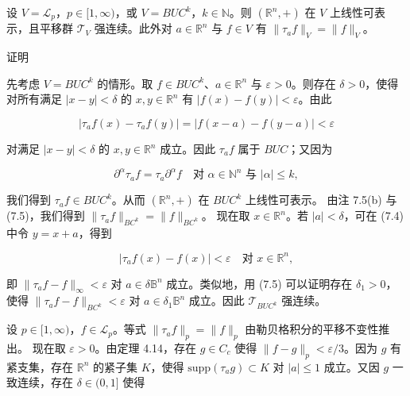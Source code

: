 \begin{theorem}

设 $ V = \mathcal{L}_{p} $，$ p \in [1,\infty) $，或 $ V = BUC^{k} $，$ k \in \mathbb{N} $。则 $ (\mathbb{R}^{n},+) $ 在 $ V $ 上线性可表示，且平移群 $ \mathcal{T}_{V} $ 强连续。此外对 $ a \in \mathbb{R}^{n} $ 与 $ f \in V $ 有 $ \|\tau_{a}f\|_{V} = \|f\|_{V} $。

证明

\begin{subitems}
\item

先考虑 $ V = BUC^{k} $ 的情形。取 $ f \in BUC^{k} $、$ a \in \mathbb{R}^{n} $ 与 $ \varepsilon > 0 $。则存在 $ \delta > 0 $，使得对所有满足 $ |x-y| < \delta $ 的 $ x, y \in \mathbb{R}^{n} $ 有 $ |f(x) - f(y)| < \varepsilon $。由此

\begin{equation}
|\tau_{a}f(x) - \tau_{a}f(y)| = |f(x-a) - f(y-a)| < \varepsilon\tag{7.4}
\end{equation}

对满足 $ |x-y| < \delta $ 的 $ x, y \in \mathbb{R}^{n} $ 成立。因此 $ \tau_{a}f $ 属于 $ BUC $；又因为

\begin{equation}
\partial^{\alpha}\tau_{a}f = \tau_{a}\partial^{\alpha}f \quad \text{对 } \alpha \in \mathbb{N}^{n} \text{ 与 } |\alpha| \le k ,\tag{7.5}
\end{equation}

我们得到 $ \tau_{a}f \in BUC^{k} $。从而 $ (\mathbb{R}^{n},+) $ 在 $ BUC^{k} $ 上线性可表示。
由注 7.5(b) 与 (7.5)，我们得到 $ \|\tau_{a}f\|_{BC^{k}} = \|f\|_{BC^{k}} $。
现在取 $ x \in \mathbb{R}^{n} $。若 $ |a| < \delta $，可在 (7.4) 中令 $ y = x+a $，得到

\[
|\tau_{a}f(x) - f(x)| < \varepsilon \quad \text{对 } x \in \mathbb{R}^{n} ,
\]

即 $ \|\tau_{a}f - f\|_{\infty} < \varepsilon $ 对 $ a \in \delta\mathbb{B}^{n} $ 成立。类似地，用 (7.5) 可以证明存在 $ \delta_{1} > 0 $，使得 $ \|\tau_{a}f - f\|_{BC^{k}} < \varepsilon $ 对 $ a \in \delta_{1}\mathbb{B}^{n} $ 成立。因此 $ \mathcal{T}_{BUC^{k}} $ 强连续。

\item

设 $ p \in [1,\infty) $，$ f \in \mathcal{L}_{p} $。等式 $ \|\tau_{a}f\|_{p} = \|f\|_{p} $ 由勒贝格积分的平移不变性推出。
现在取 $ \varepsilon > 0 $。由定理 4.14，存在 $ g \in C_{c} $ 使得 $ \|f - g\|_{p} < \varepsilon/3 $。因为 $ g $ 有紧支集，存在 $ \mathbb{R}^{n} $ 的紧子集 $ K $，使得 $ \mathrm{supp}(\tau_{a}g) \subset K $ 对 $ |a| \le 1 $ 成立。又因 $ g $ 一致连续，存在 $ \delta \in (0,1] $ 使得


\end{subitems}
\end{theorem}
